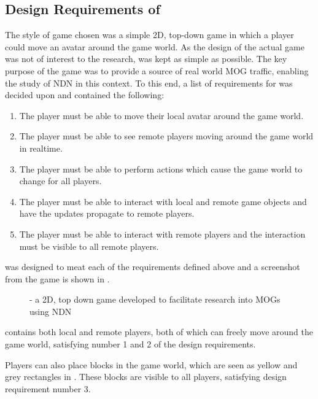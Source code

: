 \subsection{Design Requirements of \game{}}
The style of game chosen was a simple 2D, top-down game in which a player could move an avatar around the game world. As the design of the actual game was not of interest to the research, \game{} was kept as simple as possible. The key purpose of the game was to provide a source of real world MOG traffic, enabling the study of NDN in this context. To this end, a list of requirements for \game{} was decided upon and contained the following:

\begin{enumerate}
    \item The player must be able to move their local avatar around the game world.
    \item The player must be able to see remote players moving around the game world in realtime.
    \item The player must be able to perform actions which cause the game world to change for all players.
    \item The player must be able to interact with local and remote game objects and have the updates propagate to remote players.
    \item The player must be able to interact with remote players and the interaction must be visible to all remote players.
\end{enumerate}

\game{} was designed to meat each of the requirements defined above and a screenshot from the game is shown in .

\begin{figure}[H]
    \centering
    \caption{\game{} - a 2D, top down game developed to facilitate research into MOGs using NDN}
    \label{fig:des:2d-game}
\end{figure}

\game{} contains both local and remote players, both of which can freely move around the game world, satisfying number 1 and 2 of the design requirements.

Players can also place blocks in the game world, which are seen as yellow and grey rectangles in . These blocks are visible to all players, satisfying design requirement number 3.

